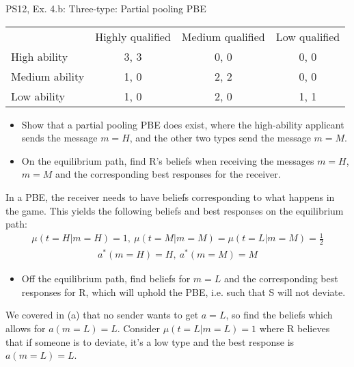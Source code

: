 \begin{frame}{PS12, Ex. 4.b: Three-type: Partial pooling PBE}
    \begin{table}
      \begin{tabular}{l|c|c|c|}
          \multicolumn{1}{c}{} & \multicolumn{1}{c}{Highly qualified} & \multicolumn{1}{c}{Medium qualified} & \multicolumn{1}{c}{Low qualified} \\\cline{2-4}
          High ability   & 3, 3 & 0, 0 & 0, 0 \\\cline{2-4}
          Medium ability & 1, 0 & 2, 2 & 0, 0 \\\cline{2-4}
          Low ability    & 1, 0 & 2, 0 & 1, 1 \\\cline{2-4}
      \end{tabular}
    \end{table}\vspace{-8pt}
    \begin{itemize}
      \item[(b)] Show that a partial pooling PBE does exist, where the high-ability applicant sends the message $m = H$, and the other two types send the message $m = M$.
      \item[Step 1:] On the equilibrium path, find R's beliefs when receiving the messages $m=H$, $m=M$ and the corresponding best responses for the receiver.
    \end{itemize}\vspace{-6pt}
    In a PBE, the receiver needs to have beliefs corresponding to what happens in the game. This yields the following beliefs and best responses on the equilibrium path:\vspace{-2pt}
    \begin{align*}
        \mu(t=H|m=H)=1,\
        \mu(t=M|m=M)=\mu(t=L|m=M)=\frac{1}{2}
    \end{align*}\vspace{-18pt}
    \begin{align*}
        a^*(m=H)=H,\ a^*(m=M)=M
    \end{align*}\vspace{-18pt}
    \begin{itemize}
      \item[Step 2:] Off the equilibrium path, find beliefs for $m=L$ and the corresponding best responses for R, which will uphold the PBE, i.e. such that S will not deviate.
    \end{itemize}\vspace{-6pt}
    We covered in (a) that no sender wants to get $a=L$, so find the beliefs which allows for $a(m=L)=L$. Consider $\mu(t=L|m=L)=1$ where R believes that if someone is to deviate, it's a low type and the best response is $a(m=L)=L$.\vspace{-2pt}
    \vfill\null
\end{frame}
